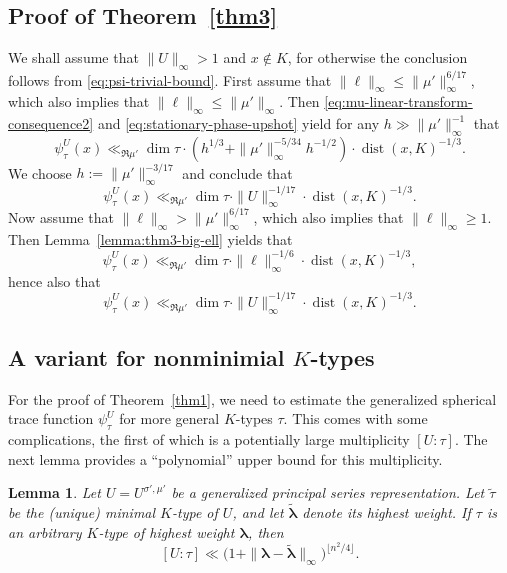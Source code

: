 \documentclass[11pt,oneside]{amsart}
\numberwithin{equation}{section}
\theoremstyle{remark}
\theoremstyle{plain}
\newtheorem{lemma}{Lemma}
\DeclareMathOperator{\dist}{dist}
\renewcommand\leq{\leqslant}
\renewcommand\geq{\geqslant}
\begin{document}
\subsection{Proof of Theorem~\ref{thm3}}\label{thm3endgame}
We shall assume that $\|U\|_{\infty}>1$ and $x\not\in K$, for otherwise the conclusion follows from \eqref{eq:psi-trivial-bound}. First assume that $\|\bm{\ell}\|_{\infty}\leq\|\mu'\|_{\infty}^{6/17}$, which also implies that $\|\bm{\ell}\|_{\infty}\leq\|\mu'\|_{\infty}$. Then \eqref{eq:mu-linear-transform-consequence2} and \eqref{eq:stationary-phase-upshot} yield for any $h\gg\|\mu'\|_{\infty}^{-1}$ that
\[\psi_\tau^{U}(x)
\ll_{\Re\mu'} \dim\tau\cdot\left(h^{1/3} + \|\mu'\|_{\infty}^{-5/34}h^{-1/2}\right)\cdot\dist(x,K)^{-1/3}.\]
We choose $h:=\|\mu'\|_{\infty}^{-3/17}$ and conclude that
\[\psi_\tau^{U}(x) \ll_{\Re\mu'} \dim\tau\cdot\|U\|_{\infty}^{-1/17}\cdot\dist(x,K)^{-1/3}.\]
Now assume that $\|\bm{\ell}\|_{\infty}>\|\mu'\|_{\infty}^{6/17}$, which also implies that $\|\bm{\ell}\|_{\infty}\geq 1$. Then Lemma~\ref{lemma:thm3-big-ell} yields that
\[\psi_{\tau}^{U}(x) \ll_{\Re\mu'} \dim \tau \cdot \|\bm\ell\|_{\infty}^{-1/6}\cdot\dist(x,K)^{-1/3},\]
hence also that
\[\psi_{\tau}^{U}(x) \ll_{\Re\mu'} \dim \tau \cdot \|U\|_{\infty}^{-1/17}\cdot\dist(x,K)^{-1/3}.\]

\subsection{A variant for nonminimial $K$-types}\label{thm3bsubsection}
For the proof of Theorem~\ref{thm1}, we need to estimate the generalized spherical trace function $\psi_\tau^U$ for more general $K$-types $\tau$. This comes with some complications, the first of which is a potentially large multiplicity $[U:\tau]$. The next lemma provides a ``polynomial'' upper bound for this multiplicity. 

\begin{lemma}\label{lemma:multiplicitybound} Let $U=U^{\sigma',\mu'}$ be a generalized principal series representation. Let $\tilde\tau$ be the (unique) minimal $K$-type of $U$, and let $\tilde{\bm\lambda}$ denote its highest weight. If $\tau$ is an arbitrary $K$-type of highest weight $\bm\lambda$, then
\[[U:\tau]\ll\bigl(1+\|\bm\lambda-\tilde{\bm\lambda}\|_\infty\bigr)^{\lfloor n^2/4\rfloor}.\]
\end{lemma}
\end{document}
